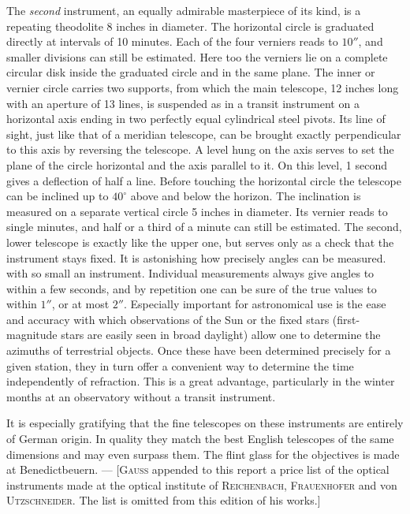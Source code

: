 \par\indent The \emph{second} instrument, an equally admirable masterpiece of its kind, is a repeating theodolite 8 inches in diameter. The horizontal circle is graduated directly at intervals of 10 minutes. Each of the four verniers reads to $10''$, and smaller divisions can still be estimated. Here too the verniers lie on a complete circular disk inside the graduated circle and in the same plane. The inner or vernier circle carries two supports, from which the main telescope, 12 inches long with an aperture of 13 lines, is suspended as in a transit instrument on a horizontal axis ending in two perfectly equal cylindrical steel pivots. Its line of sight, just like that of a meridian telescope, can be brought exactly perpendicular to this axis by reversing the telescope. A level hung on the axis serves to set the plane of the circle horizontal and the axis parallel to it. On this level, 1 second gives a deflection of half a line. Before touching the horizontal circle the telescope can be inclined up to $40^\circ$ above and below the horizon. The inclination is measured on a separate vertical circle 5 inches in diameter. Its vernier reads to single minutes, and half or a third of a minute can still be estimated. The second, lower telescope is exactly like the upper one, but serves only as a check that the instrument stays fixed. It is astonishing how precisely angles can be measured. with so small an instrument. Individual measurements always give angles to within a few seconds, and by repetition one can be sure of the true values to within $1''$, or at most $2''$. Especially important for astronomical use is the ease and accuracy with which observations of the Sun or the fixed stars (first-magnitude stars are easily seen in broad daylight) allow one to determine the azimuths of terrestrial objects. Once these have been determined precisely for a given station, they in turn offer a convenient way to determine the time independently of refraction. This is a great advantage, particularly in the winter months at an observatory without a transit instrument.

\par\indent It is especially gratifying that the fine telescopes on these instruments are entirely of German origin. In quality they match the best English telescopes of the same dimensions and may even surpass them. The flint glass for the objectives is made at Benedictbeuern. --- [\textsc{Gauss} appended to this report a price list of the optical instruments made at the optical institute of \textsc{Reichenbach}, \textsc{Frauenhofer} and von \textsc{Utzschneider}. The list is omitted from this edition of his works.]
